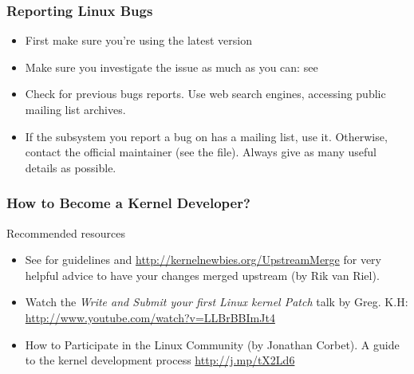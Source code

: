 \begin{frame}
  \frametitle{Reporting Linux Bugs}
  \begin{itemize}
  \item First make sure you're using the latest version
  \item Make sure you investigate the issue as much as you can: see
  \item Check for previous bugs reports. Use web search engines,
    accessing public mailing list archives.
  \item If the subsystem you report a bug on has a mailing list, use
    it. Otherwise, contact the official maintainer (see the
     file). Always give as many useful details as
    possible.
  \end{itemize}
\end{frame}

\begin{frame}
  \frametitle{How to Become a Kernel Developer?}
  Recommended resources
  \begin{itemize}
  \item See  for guidelines
    and \url{http://kernelnewbies.org/UpstreamMerge} for very
    helpful advice to have your changes merged upstream (by Rik van
    Riel).
  \item Watch the \emph{Write and Submit your first Linux kernel
      Patch} talk by Greg. K.H:
    \url{http://www.youtube.com/watch?v=LLBrBBImJt4}
  \item How to Participate in the Linux Community (by Jonathan
    Corbet). A guide to the kernel development process
    \url{http://j.mp/tX2Ld6}
  \end{itemize}
\end{frame}

